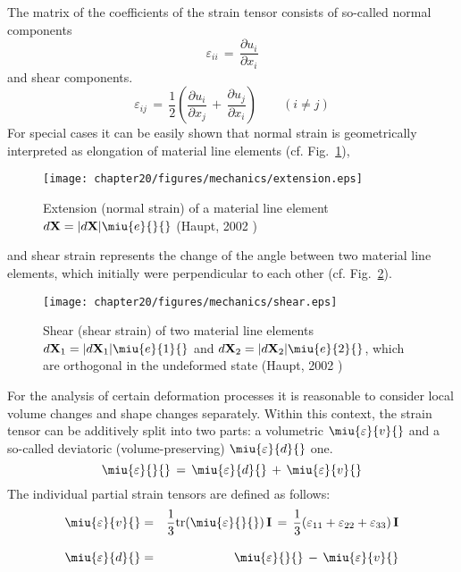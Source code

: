 The matrix of the coefficients of the strain tensor consists of so-called normal components
\begin{equation}
\varepsilon_{ii}\,=\,\frac{\partial u_i}{\partial x_i}
\label{eq:straintensnormal}
\end{equation}
and shear components.
\begin{equation}
\varepsilon_{ij}\,=\,
\frac{1}{2}\left(\frac{\partial u_i}{\partial x_j}\,+\,\frac{\partial u_j}{\partial x_i}\right)
\qquad(i\neq{j})
\label{eq:straintensshear}
\end{equation}
For special cases it can be easily shown that normal strain is geometrically interpreted as elongation of material line elements (cf. Fig.~\ref{fig:extension}),
\begin{figure}[htb!]
\begin{center}
\footnotesize
\texttt{[image: chapter20/figures/mechanics/extension.eps]}
\caption{Extension (normal strain) of a material line element $d\mathbf{X}=\vert d\mathbf{X}\vert\miu{e}{}{}$
(Haupt, 2002 \cite{Haupt:2002})}
\label{fig:extension}
\end{center}
\end{figure}

and shear strain represents the change of the angle between two material line elements, which initially were perpendicular to each other (cf. Fig.~\ref{fig:shear}).
\begin{figure}[htb!]
\begin{center}
\footnotesize
\texttt{[image: chapter20/figures/mechanics/shear.eps]}
\caption{Shear (shear strain) of two material line elements $d\mathbf{X}_1=\vert d\mathbf{X}_1\vert\miu{e}{1}{}$ and $d\mathbf{X}_2=\vert d\mathbf{X}_2\vert\miu{e}{2}{}$, which are orthogonal in the undeformed state (Haupt, 2002 \cite{Haupt:2002})}
\label{fig:shear}
\end{center}
\end{figure}

For the analysis of certain deformation processes it is reasonable to consider local volume changes and shape changes separately. Within this context, the strain tensor can be additively split into two parts: a volumetric $\miu{\varepsilon}{v}{}$ and a so-called deviatoric (volume-preserving) $\miu{\varepsilon}{d}{}$ one.
\begin{equation}
\miu{\varepsilon}{}{}\,=\,\miu{\varepsilon}{d}{}\,+\,\miu{\varepsilon}{v}{}
\label{eq:strainsplit}
\end{equation}
The individual partial strain tensors are defined as follows:
\begin{eqnarray}
\miu{\varepsilon}{v}{} & = & \frac{1}{3}\mathrm{tr}(\miu{\varepsilon}{}{})\,\mathbf{I}\,=\,
\frac{1}{3}(\varepsilon_{11}+\varepsilon_{22}+\varepsilon_{33})\,\mathbf{I}
\label{eq:devstrain}
 \\[2.0ex]
\miu{\varepsilon}{d}{} & = & \miu{\varepsilon}{}{}\,-\,\miu{\varepsilon}{v}{}
\label{eq:volstrain}
\end{eqnarray}

